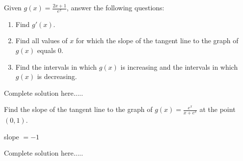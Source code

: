 \begin{example}
Given $g(x)=\displaystyle\frac{2x+1}{e^x}$, answer the following questions:
\renewcommand{\labelenumi}{\textbf{(\alph{enumi})}}
\begin{enumerate}[leftmargin=*]
\item Find $g'(x)$.
\item Find all values of $x$ for which the slope of the tangent line to the graph of $g(x)$ equals 0.

\item Find the intervals in which $g(x)$ is increasing and the intervals in which $g(x)$ is decreasing.
\end{enumerate}
    \begin{sol}
    \end{sol}
    \begin{solL}
    Complete solution here.....
    
    \end{solL}
    
\end{example}
\newpage
\begin{example}
Find the slope of the tangent line to the graph of  $g(x)=\displaystyle\frac{e^x}{x+e^x }$ at the point $(0, 1)$.
\end{example}
    \begin{sol}
    slope $=-1$
    \end{sol}
    \begin{solL}
    Complete solution here.....
    
    \end{solL}
